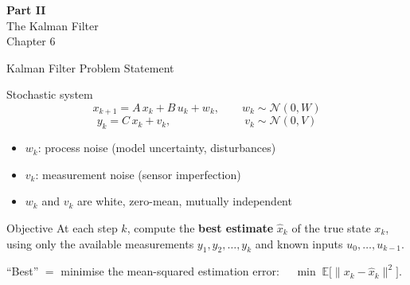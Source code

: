 \documentclass[aspectratio=169,11pt]{beamer}
\begin{document}
\begin{frame}{}
\centering
\vfill
{\Huge\bfseries Part II}\\[12pt]
{\Large The Kalman Filter}\\[6pt]
{\normalsize Chapter 6}
\vfill
\end{frame}

\begin{frame}[shrink=3]{Kalman Filter Problem Statement}
\begin{block}{Stochastic system}
\[
  x_{k+1} = A\,x_k + B\,u_k + w_k, \qquad w_k \sim \mathcal{N}(0, W)
\]
\[
  y_k = C\,x_k + v_k, \qquad\qquad\qquad\;\; v_k \sim \mathcal{N}(0, V)
\]
\begin{itemize}
  \item $w_k$: process noise (model uncertainty, disturbances)
  \item $v_k$: measurement noise (sensor imperfection)
  \item $w_k$ and $v_k$ are white, zero-mean, mutually independent
\end{itemize}
\end{block}

\begin{block}{Objective}
At each step $k$, compute the \textbf{best estimate} $\hat{x}_k$ of the true state $x_k$,
using only the available measurements $y_1, y_2, \ldots, y_k$ and known inputs $u_0, \ldots, u_{k-1}$.

\medskip
``Best'' $=$ minimise the mean-squared estimation error:
$\quad \min\; \mathbb{E}\bigl[\|x_k - \hat{x}_k\|^2\bigr]$.
\end{block}
\end{frame}
\end{document}
